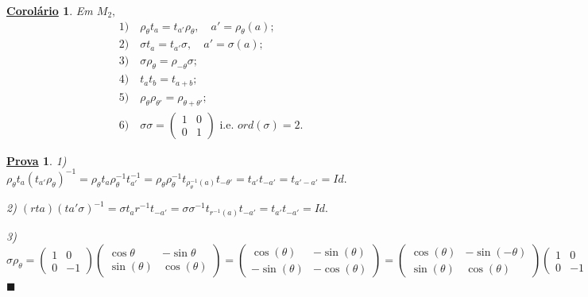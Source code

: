 \documentclass{article}
\newtheorem*{crl*}{\underline{Corol\'ario}}
\newtheorem*{proof*}{\underline{Prova}}
\renewcommand\qedsymbol{$\blacksquare$}
\begin{document}
\begin{crl*}
  Em $M_{2},$
 \begin{align*}
   &1)\quad \rho_{\theta }t_{a} = t_{a'}\rho_{\theta },\quad a'=\rho_{\theta }(a);\\
   &2)\quad \sigma t_{a} = t_{a'}\sigma , \quad a'= \sigma(a);\\
   &3)\quad \sigma \rho_{\theta } = \rho_{-\theta }\sigma;\\
   &4)\quad t_{a}t_{b} = t_{a+b};\\
   &5)\quad \rho_{\theta }\rho_{\theta '} = \rho_{\theta +\theta '};\\
   &6)\quad \sigma \sigma = \begin{pmatrix}
     1 & 0 \\
     0 & 1
   \end{pmatrix}\text{ i.e. } ord(\sigma ) = 2.
 \end{align*}
\end{crl*}
\begin{proof*}

  1) $\rho_{\theta }t_{a}(t_{a'}\rho_{\theta })^{-1} = \rho_{\theta }t_{a}\rho_{\theta }^{-1}t_{a'}^{-1} = \rho_{\theta }\rho_{\theta }^{-1}t_{\rho_{\theta }^{-1}(a)}t_{-\theta '}
  = t_{a'}t_{-a'} = t_{a'-a'} = Id.$

  2) $(rta)(ta'\sigma )^{-1} = \sigma t_{a}r^{-1}t_{-a'} = \sigma \sigma^{-1}t_{r^{-1}(a)}t_{-a'} = t_{a'}t_{-a'} = Id.$

  3) $\sigma \rho_{\theta } = \begin{pmatrix}
    1 & 0\\
    0 & -1
  \end{pmatrix}\begin{pmatrix}
    \cos{\theta } & -\sin{\theta }\\ 
    \sin{(\theta )} & \cos{(\theta )}
  \end{pmatrix} = \begin{pmatrix}
    \cos{(\theta )} & -\sin{(\theta )}\\
    -\sin{(\theta )} & -\cos{(\theta )}
  \end{pmatrix} = \begin{pmatrix}
    \cos{(\theta )} & -\sin{(-\theta )}\\
    \sin{(\theta )} & \cos{(\theta )}
  \end{pmatrix}\begin{pmatrix}
    1 & 0 \\
    0 & -1
  \end{pmatrix} = \rho_{-\theta }\sigma.$ \qedsymbol
\end{proof*}
\newpage
\end{document}

